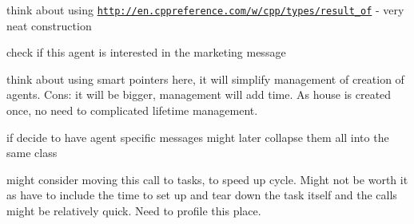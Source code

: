 
\begin{DoxyRefList}
\item[\label{_dev_stage3__DevStage3000002}%
\hypertarget{_dev_stage3__DevStage3000002}{}%
Class \hyperlink{classsolar__core_1_1_household}{solar\+\_\+core\+:\+:Household} ]think about using \href{http://en.cppreference.com/w/cpp/types/result_of}{\tt http\+://en.\+cppreference.\+com/w/cpp/types/result\+\_\+of} -\/ very neat construction 
\item[\label{_dev_stage3__DevStage3000001}%
\hypertarget{_dev_stage3__DevStage3000001}{}%
Member \hyperlink{classsolar__core_1_1_household_ac9d26af7b52f0cdc357fc5dca4b86ad9}{solar\+\_\+core\+:\+:Household\+:\+:get\+\_\+inf} (std\+::shared\+\_\+ptr$<$ Mes\+Marketing\+S\+E\+I $>$ mes\+\_\+) override]check if this agent is interested in the marketing message  
\item[\label{_dev_stage3__DevStage3000003}%
\hypertarget{_dev_stage3__DevStage3000003}{}%
Member \hyperlink{classsolar__core_1_1_household_a3ae4cec5fca43ee5ca3287a01f5a05a2}{solar\+\_\+core\+:\+:Household\+:\+:get\+\_\+inf\+\_\+marketing\+\_\+sei} ]think about using smart pointers here, it will simplify management of creation of agents. Cons\+: it will be bigger, management will add time. As house is created once, no need to complicated lifetime management.  
\item[\label{_dev_stage3__DevStage3000004}%
\hypertarget{_dev_stage3__DevStage3000004}{}%
Class \hyperlink{classsolar__core_1_1_mes_state_base_h_h}{solar\+\_\+core\+:\+:Mes\+State\+Base\+H\+H} ]if decide to have agent specific messages might later collapse them all into the same class 
\item[\label{_dev_stage3__DevStage3000005}%
\hypertarget{_dev_stage3__DevStage3000005}{}%
Member \hyperlink{classsolar__core_1_1_w_a08283dbea7c7f3fe8b7f094a96f73a78}{solar\+\_\+core\+:\+:W\+:\+:life\+\_\+hhs} ()]might consider moving this call to tasks, to speed up cycle. Might not be worth it as have to include the time to set up and tear down the task itself and the calls might be relatively quick. Need to profile this place. 
\end{DoxyRefList}